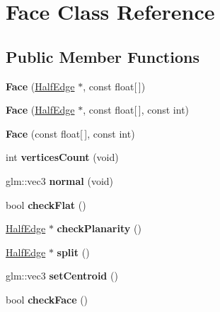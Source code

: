 \hypertarget{class_face}{\section{Face Class Reference}
\label{class_face}
}
\subsection*{Public Member Functions}
\begin{DoxyCompactItemize}
\item 
\hypertarget{class_face_a0255049fb86115ba6a0e8d4ad0228d63}{{\bfseries Face} (\hyperlink{class_half_edge}{Half\-Edge} $\ast$, const float\mbox{[}$\,$\mbox{]})}\label{class_face_a0255049fb86115ba6a0e8d4ad0228d63}

\item 
\hypertarget{class_face_a186f1fdd1aaa982fee07eb145399e468}{{\bfseries Face} (\hyperlink{class_half_edge}{Half\-Edge} $\ast$, const float\mbox{[}$\,$\mbox{]}, const int)}\label{class_face_a186f1fdd1aaa982fee07eb145399e468}

\item 
\hypertarget{class_face_a4843e7eb710b8e9a8b54f5362683f81e}{{\bfseries Face} (const float\mbox{[}$\,$\mbox{]}, const int)}\label{class_face_a4843e7eb710b8e9a8b54f5362683f81e}

\item 
\hypertarget{class_face_a82ac769916338bc6ccfb42b3f8bc7818}{int {\bfseries vertices\-Count} (void)}\label{class_face_a82ac769916338bc6ccfb42b3f8bc7818}

\item 
\hypertarget{class_face_a46b5153448ece506b9c09189cc4a8c9c}{glm\-::vec3 {\bfseries normal} (void)}\label{class_face_a46b5153448ece506b9c09189cc4a8c9c}

\item 
\hypertarget{class_face_a3508f3ca1149c443502fa6ce968cff02}{bool {\bfseries check\-Flat} ()}\label{class_face_a3508f3ca1149c443502fa6ce968cff02}

\item 
\hypertarget{class_face_a4b38278278ceba03a7264c3387b3073c}{\hyperlink{class_half_edge}{Half\-Edge} $\ast$ {\bfseries check\-Planarity} ()}\label{class_face_a4b38278278ceba03a7264c3387b3073c}

\item 
\hypertarget{class_face_a85813814597703b2c417e7cd28535e40}{\hyperlink{class_half_edge}{Half\-Edge} $\ast$ {\bfseries split} ()}\label{class_face_a85813814597703b2c417e7cd28535e40}

\item 
\hypertarget{class_face_ac53fffc576a42be44bc11f5d7787a23f}{glm\-::vec3 {\bfseries set\-Centroid} ()}\label{class_face_ac53fffc576a42be44bc11f5d7787a23f}

\item 
\hypertarget{class_face_ac9d32f6a8ab5ec986ed06141a7c3a4c1}{bool {\bfseries check\-Face} ()}\label{class_face_ac9d32f6a8ab5ec986ed06141a7c3a4c1}

\end{DoxyCompactItemize}
